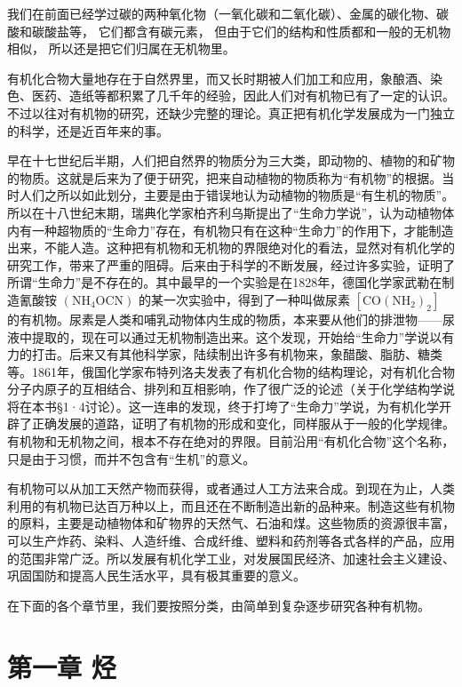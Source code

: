 我们在前面已经学过碳的两种氧化物（一氧化碳和二氧化碳）、金属的碳化物、碳酸和碳酸盐等，
它们都含有碳元素， 但由于它们的结构和性质都和一般的无机物相似，
所以还是把它们归属在无机物里。

有机化合物大量地存在于自然界里，而又长时期被人们加工和应用，象酿酒、染色、医药、造纸等都积累了几千年的经验，因此人们对有机物已有了一定的认识。不过以往对有机物的研究，还缺少完整的理论。真正把有机化学发展成为一门独立的科学，还是近百年来的事。

早在十七世纪后半期，人们把自然界的物质分为三大类，即动物的、植物的和矿物的物质。这就是后来为了便于研究，把来自动植物的物质称为``有机物''的根据。当时人们之所以如此划分，主要是由于错误地认为动植物的物质是``有生机的物质''。所以在十八世纪末期，瑞典化学家柏齐利乌斯提出了``生命力学说''，认为动植物体内有一种超物质的``生命力''存在，有机物只有在这种``生命力''的作用下，才能制造出来，不能人造。这种把有机物和无机物的界限绝对化的看法，显然对有机化学的研究工作，带来了严重的阻碍。后来由于科学的不断发展，经过许多实验，证明了所谓``生命力''是不存在的。其中最早的一个实验是在1828年，德国化学家武勒在制造氰酸铵
\(\left(\mathrm{NH}_{4}\mathrm{OCN}\right)\)
的某一次实验中，得到了一种叫做尿素
\(\left[\mathrm{CO}\left(\mathrm{NH}_{2}\right)_{2}\right]\)
的有机物。尿素是人类和哺乳动物体内生成的物质，本来要从他们的排泄物------尿液中提取的，现在可以通过无机物制造出来。这个发现，开始给``生命力''学说以有力的打击。后来又有其他科学家，陆续制出许多有机物来，象醋酸、脂肪、糖类等。1861年，俄国化学家布特列洛夫发表了有机化合物的结构理论，对有机化合物分子内原子的互相结合、排列和互相影响，作了很广泛的论述（关于化学结构学说将在本书§1·4讨论）。这一连串的发现，终于打垮了``生命力''学说，为有机化学开辟了正确发展的道路，证明了有机物的形成和变化，同样服从于一般的化学规律。有机物和无机物之间，根本不存在绝对的界限。目前沿用``有机化合物''这个名称，只是由于习惯，而并不包含有``生机''的意义。

有机物可以从加工天然产物而获得，或者通过人工方法来合成。到现在为止，人类利用的有机物已达百万种以上，而且还在不断制造出新的品种来。制造这些有机物的原料，主要是动植物体和矿物界的天然气、石油和煤。这些物质的资源很丰富，可以生产炸药、染料、人造纤维、合成纤维、塑料和药剂等各式各样的产品，应用的范围非常广泛。所以发展有机化学工业，对发展国民经济、加速社会主义建设、巩固国防和提高人民生活水平，具有极其重要的意义。

在下面的各个章节里，我们要按照分类，由简单到复杂逐步研究各种有机物。

\chapter{第一章 烃}

